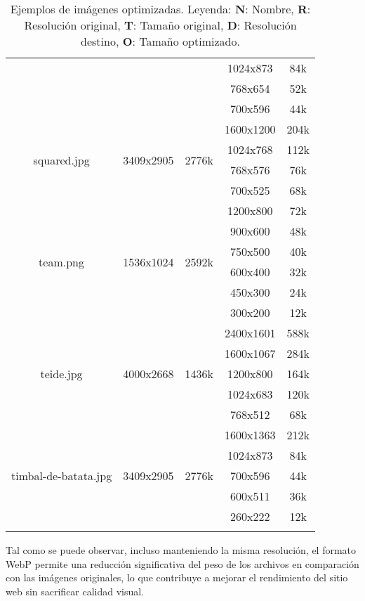 \documentclass{article}
\begin{document}
\begin{longtable}{c|c|c|c|c}
     &  &  & 1024x873 & 84k \\
     &  &  & 768x654 & 52k \\
     &  &  & 700x596 & 44k \\
    \hline
    \multirow{4}{*}{squared.jpg} & \multirow{4}{*}{3409x2905} & \multirow{4}{*}{2776k} & 1600x1200 & 204k \\
     &  &  & 1024x768 & 112k \\
     &  &  & 768x576 & 76k \\
     &  &  & 700x525 & 68k \\
    \hline
    \multirow{6}{*}{team.png} & \multirow{6}{*}{1536x1024} & \multirow{6}{*}{2592k} & 1200x800 & 72k \\
     &  &  & 900x600 & 48k \\
     &  &  & 750x500 & 40k \\
     &  &  & 600x400 & 32k \\
     &  &  & 450x300 & 24k \\
     &  &  & 300x200 & 12k \\
    \hline
    \multirow{5}{*}{teide.jpg} & \multirow{5}{*}{4000x2668} & \multirow{5}{*}{1436k} & 2400x1601 & 588k \\
     &  &  & 1600x1067 & 284k \\
     &  &  & 1200x800 & 164k \\
     &  &  & 1024x683 & 120k \\
     &  &  & 768x512 & 68k \\
    \hline
    \multirow{5}{*}{timbal-de-batata.jpg} & \multirow{5}{*}{3409x2905} & \multirow{5}{*}{2776k} & 1600x1363 & 212k \\
     &  &  & 1024x873 & 84k \\
     &  &  & 700x596 & 44k \\
     &  &  & 600x511 & 36k \\
     &  &  & 260x222 & 12k \\
    \hline
    \caption{
        Ejemplos de imágenes optimizadas.
        Leyenda: 
        \textbf{N}: Nombre, 
        \textbf{R}: Resolución original, 
        \textbf{T}: Tamaño original, 
        \textbf{D}: Resolución destino, 
        \textbf{O}: Tamaño optimizado.
    }
    \label{tab:imagenes-optimizadas}
\end{longtable}

Tal como se puede observar, incluso manteniendo la misma resolución, el formato WebP permite una reducción significativa del peso de los archivos en comparación con las imágenes originales, lo que contribuye a mejorar el rendimiento del sitio web sin sacrificar calidad visual.
\end{document}
